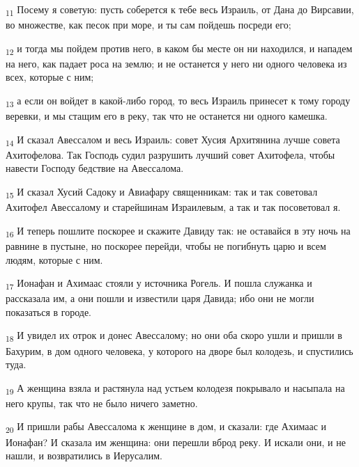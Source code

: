 \begin{tcolorbox}
\textsubscript{11} Посему я советую: пусть соберется к тебе весь Израиль, от Дана до Вирсавии, во множестве, как песок при море, и ты сам пойдешь посреди его;
\end{tcolorbox}
\begin{tcolorbox}
\textsubscript{12} и тогда мы пойдем против него, в каком бы месте он ни находился, и нападем на него, как падает роса на землю; и не останется у него ни одного человека из всех, которые с ним;
\end{tcolorbox}
\begin{tcolorbox}
\textsubscript{13} а если он войдет в какой-либо город, то весь Израиль принесет к тому городу веревки, и мы стащим его в реку, так что не останется ни одного камешка.
\end{tcolorbox}
\begin{tcolorbox}
\textsubscript{14} И сказал Авессалом и весь Израиль: совет Хусия Архитянина лучше совета Ахитофелова. Так Господь судил разрушить лучший совет Ахитофела, чтобы навести Господу бедствие на Авессалома.
\end{tcolorbox}
\begin{tcolorbox}
\textsubscript{15} И сказал Хусий Садоку и Авиафару священникам: так и так советовал Ахитофел Авессалому и старейшинам Израилевым, а так и так посоветовал я.
\end{tcolorbox}
\begin{tcolorbox}
\textsubscript{16} И теперь пошлите поскорее и скажите Давиду так: не оставайся в эту ночь на равнине в пустыне, но поскорее перейди, чтобы не погибнуть царю и всем людям, которые с ним.
\end{tcolorbox}
\begin{tcolorbox}
\textsubscript{17} Ионафан и Ахимаас стояли у источника Рогель. И пошла служанка и рассказала им, а они пошли и известили царя Давида; ибо они не могли показаться в городе.
\end{tcolorbox}
\begin{tcolorbox}
\textsubscript{18} И увидел их отрок и донес Авессалому; но они оба скоро ушли и пришли в Бахурим, в дом одного человека, у которого на дворе был колодезь, и спустились туда.
\end{tcolorbox}
\begin{tcolorbox}
\textsubscript{19} А женщина взяла и растянула над устьем колодезя покрывало и насыпала на него крупы, так что не было ничего заметно.
\end{tcolorbox}
\begin{tcolorbox}
\textsubscript{20} И пришли рабы Авессалома к женщине в дом, и сказали: где Ахимаас и Ионафан? И сказала им женщина: они перешли вброд реку. И искали они, и не нашли, и возвратились в Иерусалим.
\end{tcolorbox}
